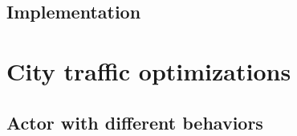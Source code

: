 \documentclass[a4paper,12pt,twoside]{book}
\begin{document}
\subsection{Implementation}



\section{City traffic optimizations}
\label{sec:citytrafficoptimizations}

\subsection{Actor with different behaviors}
\label{subsec:actordiffbehaviors}


\end{document}

